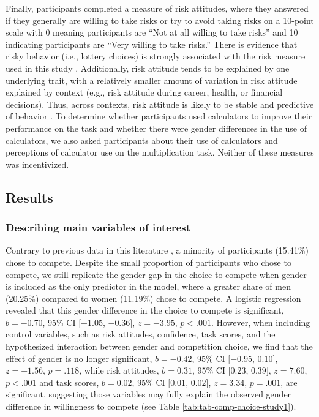 \documentclass[letterpaper, nobind]{templates/ociamthesis}
\begin{document}
Finally, participants completed a measure of risk attitudes, where they answered if they generally are willing to take risks or try to avoid taking risks \autocite{Dohmen2011b} on a 10-point scale with 0 meaning participants are ``Not at all willing to take risks'' and 10 indicating participants are ``Very willing to take risks.'' There is evidence that risky behavior (i.e., lottery choices) is strongly associated with the risk measure used in this study \autocite{Dohmen2011b}. Additionally, risk attitude tends to be explained by one underlying trait, with a relatively smaller amount of variation in risk attitude explained by context (e.g., risk attitude during career, health, or financial decisions). Thus, across contexts, risk attitude is likely to be stable and predictive of behavior \autocite{Dohmen2011b}. To determine whether participants used calculators to improve their performance on the task and whether there were gender differences in the use of calculators, we also asked participants about their use of calculators and perceptions of calculator use on the multiplication task. Neither of these measures was incentivized.

\hypertarget{results}{%
\subsection{Results}\label{results}}

\hypertarget{describing-main-variables-of-interest}{%
\subsubsection{Describing main variables of interest}\label{describing-main-variables-of-interest}}

Contrary to previous data in this literature \autocite{Niederle2007}, a minority of participants (15.41\%) chose to compete. Despite the small proportion of participants who chose to compete, we still replicate the gender gap in the choice to compete when gender is included as the only predictor in the model, where a greater share of men (20.25\%) compared to women (11.19\%) chose to compete. A logistic regression revealed that this gender difference in the choice to compete is significant, \(b = -0.70\), 95\% CI \([-1.05\), \(-0.36]\), \(z = -3.95\), \(p < .001\). However, when including control variables, such as risk attitudes, confidence, task scores, and the hypothesized interaction between gender and competition choice, we find that the effect of gender is no longer significant, \(b = -0.42\), 95\% CI \([-0.95\), \(0.10]\), \(z = -1.56\), \(p = .118\), while risk attitudes, \(b = 0.31\), 95\% CI \([0.23\), \(0.39]\), \(z = 7.60\), \(p < .001\) and task scores, \(b = 0.02\), 95\% CI \([0.01\), \(0.02]\), \(z = 3.34\), \(p = .001\), are significant, suggesting those variables may fully explain the observed gender difference in willingness to compete (see Table \ref{tab:tab-comp-choice-study1}).
\end{document}
